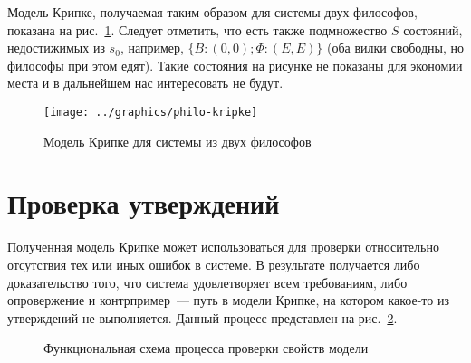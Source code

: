 Модель Крипке, получаемая таким образом для системы двух философов, показана на
рис.~\ref{fig:philo2-kripke}. Следует отметить, что есть также подмножество $S$ состояний,
недостижимых из $s_0$, например, $\{B: (0, 0); \Phi: (E, E)\}$ (оба вилки свободны, но
философы при этом едят). Такие состояния на рисунке не показаны для экономии места и в
дальнейшем нас интересовать не будут.

\begin{figure}[ht]
  \centering
  \texttt{[image: ../graphics/philo-kripke]}
  \caption{Модель Крипке для системы из двух философов}
  \label{fig:philo2-kripke}
\end{figure}

\section{Проверка утверждений}
\label{sec:kripke-verification}

Полученная модель Крипке может использоваться для проверки относительно отсутствия тех или
иных ошибок в системе. В результате получается либо доказательство того, что система
удовлетворяет всем требованиям, либо опровержение и контрпример~--- путь в модели Крипке,
на котором какое-то из утверждений не выполняется. Данный процесс представлен на
рис.~\ref{fig:idef0-verification}.

\begin{figure}[htb]
  \centering
  \caption{Функциональная схема процесса проверки свойств модели}
  \label{fig:idef0-verification}
\end{figure}

